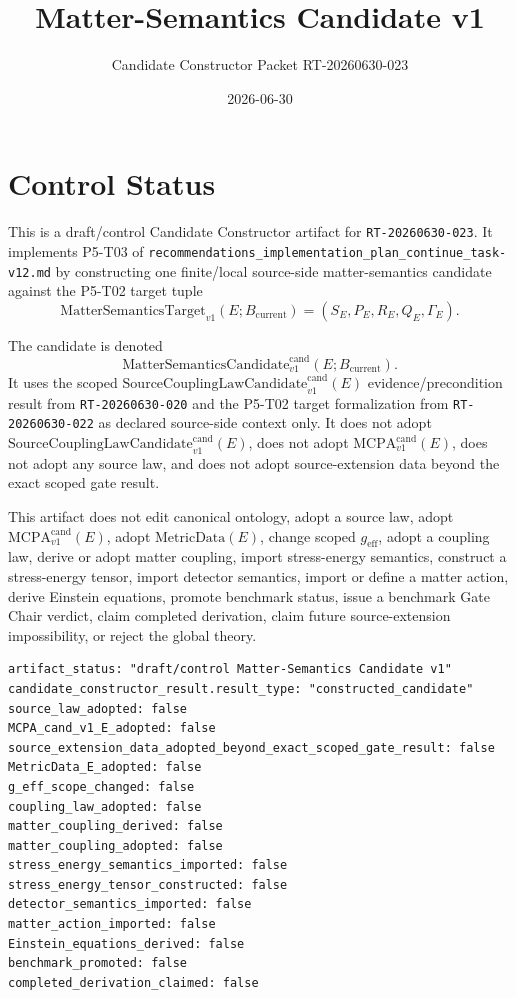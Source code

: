 \documentclass[11pt]{article}
\title{Matter-Semantics Candidate v1}
\author{Candidate Constructor Packet RT-20260630-023}
\date{2026-06-30}
\newcommand{\MetricData}{\mathrm{MetricData}}
\newcommand{\geff}{g_{\mathrm{eff}}}
\newcommand{\MCPA}{\mathrm{MCPA}^{\mathrm{cand}}_{v1}}
\newcommand{\SCLC}{\mathrm{SourceCouplingLawCandidate}^{\mathrm{cand}}_{v1}}
\newcommand{\Bcur}{B_{\mathrm{current}}}
\newcommand{\Target}{\mathrm{MatterSemanticsTarget}_{v1}}
\newcommand{\MSCand}{\mathrm{MatterSemanticsCandidate}^{\mathrm{cand}}_{v1}}
\begin{document}
\maketitle

\section{Control Status}

This is a draft/control Candidate Constructor artifact for
\texttt{RT-20260630-023}. It implements P5-T03 of
\texttt{recommendations\_implementation\_plan\_continue\_task-v12.md} by
constructing one finite/local source-side matter-semantics candidate against
the P5-T02 target tuple
\[
  \Target(E;\Bcur)=(S_E,P_E,R_E,Q_E,\Gamma_E).
\]

The candidate is denoted
\[
  \MSCand(E;\Bcur).
\]
It uses the scoped \(\SCLC(E)\) evidence/precondition result from
\texttt{RT-20260630-020} and the P5-T02 target formalization from
\texttt{RT-20260630-022} as declared source-side context only. It does not
adopt \(\SCLC(E)\), does not adopt \(\MCPA(E)\), does not adopt any source law,
and does not adopt source-extension data beyond the exact scoped gate result.

This artifact does not edit canonical ontology, adopt a source law, adopt
\(\MCPA(E)\), adopt \(\MetricData(E)\), change scoped \(\geff\), adopt a
coupling law, derive or adopt matter coupling, import stress-energy semantics,
construct a stress-energy tensor, import detector semantics, import or define
a matter action, derive Einstein equations, promote benchmark status, issue a
benchmark Gate Chair verdict, claim completed derivation, claim future
source-extension impossibility, or reject the global theory.

\begin{verbatim}
artifact_status: "draft/control Matter-Semantics Candidate v1"
candidate_constructor_result.result_type: "constructed_candidate"
source_law_adopted: false
MCPA_cand_v1_E_adopted: false
source_extension_data_adopted_beyond_exact_scoped_gate_result: false
MetricData_E_adopted: false
g_eff_scope_changed: false
coupling_law_adopted: false
matter_coupling_derived: false
matter_coupling_adopted: false
stress_energy_semantics_imported: false
stress_energy_tensor_constructed: false
detector_semantics_imported: false
matter_action_imported: false
Einstein_equations_derived: false
benchmark_promoted: false
completed_derivation_claimed: false
\end{verbatim}
\end{document}
